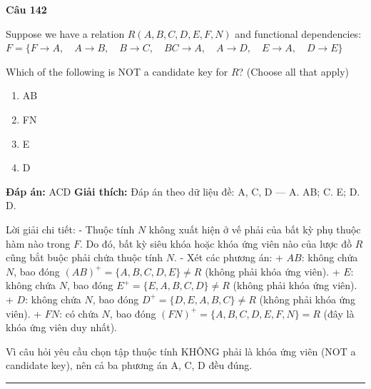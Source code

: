 \documentclass[11pt,a4paper]{article}
\newenvironment{question}[1]{%
  \par\vspace{1em}\noindent\textbf{\large Câu #1}\par\vspace{0.4em}
}{%
  \par\vspace{1em}\hrule\vspace{0.6em}
}
\newenvironment{choices}{%
  \begin{enumerate}[label=\textbf{\Alph*.},leftmargin=2.2em,itemsep=2pt,topsep=3pt]
}{%
  \end{enumerate}
}
\newcommand{\choice}{\item}
\begin{document}
\begin{question}{142}
Suppose we have a relation \(R(A, B, C, D, E, F, N)\) and functional dependencies:
\(F = \{ F \rightarrow A, \quad A \rightarrow B, \quad B \rightarrow C, \quad BC \rightarrow A, \quad A \rightarrow D, \quad E \rightarrow A, \quad D \rightarrow E \}\)

Which of the following is NOT a candidate key for \(R\)? (Choose all that apply)
\begin{choices}
\choice AB
\choice FN
\choice E
\choice D
\end{choices}
\textbf{Đáp án:} ACD
\textbf{Giải thích:} Đáp án theo dữ liệu đề: A, C, D — A. AB; C. E; D. D.

Lời giải chi tiết:
- Thuộc tính $N$ không xuất hiện ở vế phải của bất kỳ phụ thuộc hàm nào trong $F$. Do đó, bất kỳ siêu khóa hoặc khóa ứng viên nào của lược đồ $R$ cũng bắt buộc phải chứa thuộc tính $N$.
- Xét các phương án:
  + $AB$: không chứa $N$, bao đóng $(AB)^+ = \{A, B, C, D, E\} \neq R$ (không phải khóa ứng viên).
  + $E$: không chứa $N$, bao đóng $E^+ = \{E, A, B, C, D\} \neq R$ (không phải khóa ứng viên).
  + $D$: không chứa $N$, bao đóng $D^+ = \{D, E, A, B, C\} \neq R$ (không phải khóa ứng viên).
  + $FN$: có chứa $N$, bao đóng $(FN)^+ = \{A, B, C, D, E, F, N\} = R$ (đây là khóa ứng viên duy nhất).

Vì câu hỏi yêu cầu chọn tập thuộc tính KHÔNG phải là khóa ứng viên (NOT a candidate key), nên cả ba phương án A, C, D đều đúng.
\end{question}
\end{document}

